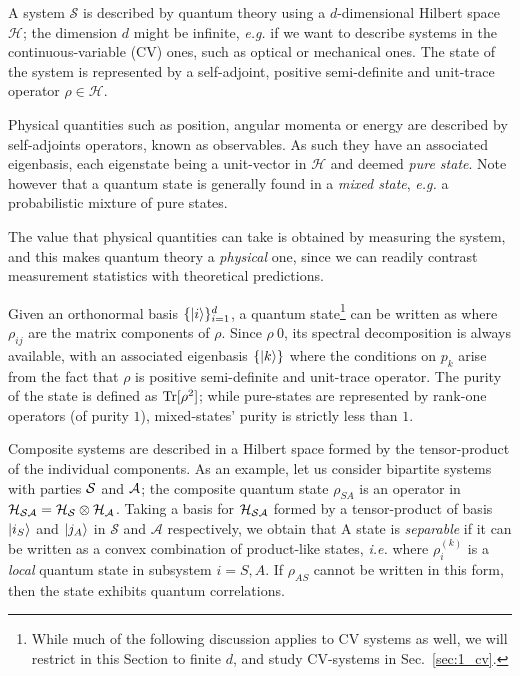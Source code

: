 
A system $\mathcal{S}$ is described by quantum theory using a $d$-dimensional Hilbert space $\mathcal{H}$; the dimension $d$ might be infinite, \textit{e.g.} if we want to describe systems in the continuous-variable (CV) ones, such as optical or mechanical ones. The state of the system is represented by a self-adjoint, positive semi-definite and unit-trace operator $\rho\in\mathcal{H}$.

Physical quantities such as position, angular momenta or energy are described by self-adjoints operators, known as observables. As such they have an associated eigenbasis, each eigenstate being a unit-vector in $\mathcal{H}$ and deemed \textit{pure state}. Note however that a quantum state is generally found in a \textit{mixed state}, \textit{e.g.} a probabilistic mixture of pure states.

The value that physical quantities can take is obtained by measuring the system, and this makes quantum theory a \textit{physical} one, since we can readily contrast measurement statistics with theoretical predictions.

Given an orthonormal basis $\llaves{\ket{i}}_{i=1}^d$, a quantum state\footnote{While much of the following discussion applies to CV systems as well, we will restrict in this Section to finite $d$, and study CV-systems in Sec.~\ref{sec:1_cv}.} can be written as
 where $\rho_{ij}$ are the matrix components of $\rho$. Since $\rho\>0$, its spectral decomposition is always available, with an associated  eigenbasis $\llaves{\ket{k}}$
 where the conditions on $p_k$ arise from the fact that $\rho$ is positive semi-definite and unit-trace operator. The purity of the state is defined as $\text{Tr}[\rho^2]$; while pure-states are represented by rank-one operators (of purity $1$), mixed-states' purity is strictly less than $1$.

Composite systems are described in a Hilbert space formed by the tensor-product of the individual components. As an example, let us consider bipartite systems with parties $\mathcal{S}$ and $\mathcal{A}$; the composite quantum state $\rho_{SA}$ is an operator in $\mathcal{H}_{\mathcal{S} \mathcal{A}} = \mathcal{H}_\mathcal{S}\otimes \mathcal{H}_\mathcal{A}$. Taking a basis for $\mathcal{H}_{\mathcal{S} \mathcal{A}}$ formed by a tensor-product of basis $\ket{i_S}$ and $\ket{j_A}$ in $\mathcal{S}$ and $\mathcal{A}$ respectively, we obtain that
 A state is \textit{separable} if it can be written as a convex combination of product-like states, \textit{i.e.}
 where $\rho_i^{(k)}$ is a \textit{local} quantum state in subsystem $i=S,A$. If $\rho_{AS}$ cannot be written in this form, then the state exhibits quantum correlations.

